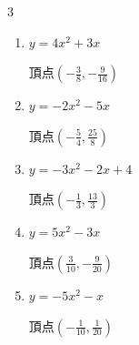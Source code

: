 \begin{multicols}{3}
\begin{enumerate}
  \item $\displaystyle y=4x^{2}+3x$

        $\displaystyle 頂点\left( -\frac{3}{8} , -\frac{9}{16} \right)$

  \item $\displaystyle y=-2x^{2}-5x$

        $\displaystyle 頂点\left( -\frac{5}{4} , \frac{25}{8} \right)$

  \item $\displaystyle y=-3x^{2}-2x+4$

        $\displaystyle 頂点\left( -\frac{1}{3} , \frac{13}{3} \right)$

  \item $\displaystyle y=5x^{2}-3x$

        $\displaystyle 頂点\left( \frac{3}{10} , -\frac{9}{20} \right)$

  \item $\displaystyle y=-5x^{2}-x$

        $\displaystyle 頂点\left( -\frac{1}{10} , \frac{1}{20} \right)$

\end{enumerate}
\end{multicols}
